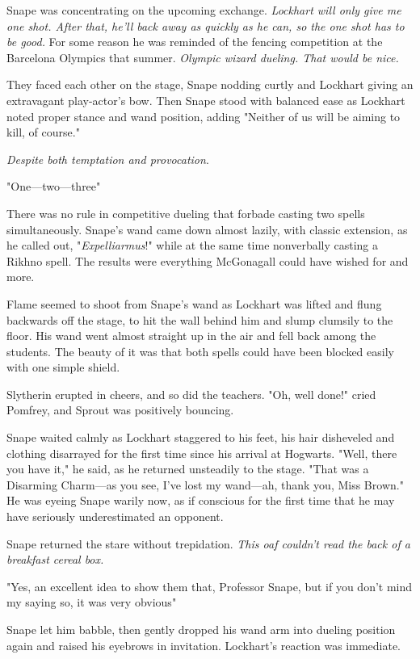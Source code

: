 Snape was concentrating on the upcoming exchange. \emph{Lockhart will only give me one shot. After that, he'll back away as quickly as he can, so the one shot has to be good.} For some reason he was reminded of the fencing competition at the Barcelona Olympics that summer. \emph{Olympic wizard dueling. That would be nice.}

They faced each other on the stage, Snape nodding curtly and Lockhart giving an extravagant play-actor's bow. Then Snape stood with balanced ease as Lockhart noted proper stance and wand position, adding "Neither of us will be aiming to kill, of course."

\emph{Despite both temptation and provocation}.

"One—two—three{\el}"

There was no rule in competitive dueling that forbade casting two spells simultaneously. Snape's wand came down almost lazily, with classic extension, as he called out, "\emph{Expelliarmus}!" while at the same time nonverbally casting a Rikhno spell. The results were everything McGonagall could have wished for and more.

Flame seemed to shoot from Snape's wand as Lockhart was lifted and flung backwards off the stage, to hit the wall behind him and slump clumsily to the floor. His wand went almost straight up in the air and fell back among the students. The beauty of it was that both spells could have been blocked easily with one simple shield.

Slytherin erupted in cheers, and so did the teachers. "Oh, well done!" cried Pomfrey, and Sprout was positively bouncing.

Snape waited calmly as Lockhart staggered to his feet, his hair disheveled and clothing disarrayed for the first time since his arrival at Hogwarts. "Well, there you have it," he said, as he returned unsteadily to the stage. "That{\el} was a Disarming Charm—as you see, I've lost my wand—ah, thank you, Miss Brown." He was eyeing Snape warily now, as if conscious for the first time that he may have seriously underestimated an opponent.

Snape returned the stare without trepidation. \emph{This oaf couldn't read the back of a breakfast cereal box.}

"Yes, an excellent idea to show them that, Professor Snape, but if you don't mind my saying so, it was very obvious{\el}"

Snape let him babble, then gently dropped his wand arm into dueling position again and raised his eyebrows in invitation. Lockhart's reaction was immediate.

